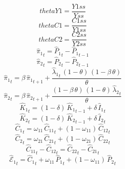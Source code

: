 \begin{dmath*}
thetaY1 = \frac{{Y1ss}}{{Yss}}
\end{dmath*}
\begin{dmath*}
thetaC1 = \frac{{C1ss}}{{Y1ss}}
\end{dmath*}
\begin{dmath*}
thetaC2 = \frac{{C2ss}}{{Y2ss}}
\end{dmath*}
\begin{dmath}
{{\hat{\pi}_{1}}}_{t}={{\hat{P}_{1}}}_{t}-{{\hat{P}_{1}}}_{t-1}
\end{dmath}
\begin{dmath}
{{\hat{\pi}_{2}}}_{t}={{\hat{P}_{2}}}_{t}-{{\hat{P}_{2}}}_{t-1}
\end{dmath}
\begin{dmath}
{{\hat{\pi}_{1}}}_{t}={{\beta}}\, {{\hat{\pi}_{1}}}_{t+1}+\frac{{{\hat{\lambda}_{1}}}_{t}\, \left(1-{{\theta}}\right)\, \left(1-{{\beta}}\, {{\theta}}\right)}{{{\theta}}}
\end{dmath}
\begin{dmath}
{{\hat{\pi}_{2}}}_{t}={{\beta}}\, {{\hat{\pi}_{2}}}_{t+1}+\frac{\left(1-{{\beta}}\, {{\theta}}\right)\, \left(1-{{\theta}}\right)\, {{\hat{\lambda}_{2}}}_{t}}{{{\theta}}}
\end{dmath}
\begin{dmath}
{{\hat{K}_{1}}}_{t}=\left(1-{{\delta}}\right)\, {{\hat{K}_{1}}}_{t-1}+{{\delta}}\, {{\hat{I}_{1}}}_{t}
\end{dmath}
\begin{dmath}
{{\hat{K}_{2}}}_{t}=\left(1-{{\delta}}\right)\, {{\hat{K}_{2}}}_{t-1}+{{\delta}}\, {{\hat{I}_{2}}}_{t}
\end{dmath}
\begin{dmath}
{{\hat{C}_{1}}}_{t}={{\omega_{11}}}\, {{\hat{C}_{1 1}}}_{t}+\left(1-{{\omega_{11}}}\right)\, {{\hat{C}_{1 2}}}_{t}
\end{dmath}
\begin{dmath}
{{\hat{C}_{2}}}_{t}={{\omega_{21}}}\, {{\hat{C}_{2 1}}}_{t}+\left(1-{{\omega_{21}}}\right)\, {{\hat{C}_{2 2}}}_{t}
\end{dmath}
\begin{dmath}
{{\hat{C}_{1 1}}}_{t}-{{\hat{C}_{1 2}}}_{t}={{\hat{C}_{2 2}}}_{t}-{{\hat{C}_{2 1}}}_{t}
\end{dmath}
\begin{dmath}
{{\hat{\mathscr{E}}_{1}}}_{t}={{\hat{C}_{1}}}_{t}+{{\omega_{11}}}\, {{\hat{P}_{1}}}_{t}+\left(1-{{\omega_{11}}}\right)\, {{\hat{P}_{2}}}_{t}
\end{dmath}
